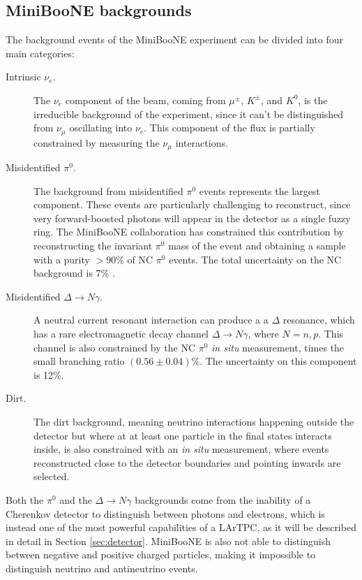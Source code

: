 \subsection*{MiniBooNE backgrounds}
The background events of the MiniBooNE experiment can be divided into four main categories:
\begin{description}
    \item[Intrinsic $\nu_e$.] The $\nu_e$ component of the beam, coming from $\mu^{\pm}$, $K^{\pm}$, and $K^0$, is the irreducible background of the experiment, since it can't be distinguished from $\nu_{\mu}$ oscillating into $\nu_{e}$. This component of the flux is partially constrained by measuring the $\nu_{\mu}$ interactions.
    \item[Misidentified $\pi^0$.] The background from misidentified $\pi^0$ events represents the largest component. These events are particularly challenging to reconstruct, since very forward-boosted photons will appear in the detector as a single fuzzy ring. The MiniBooNE collaboration has constrained this contribution by reconstructing the invariant $\pi^0$ mass of the event and obtaining a sample with a purity $>90\%$ of NC $\pi^0$ events. The total uncertainty on the NC background is 7\% \cite{Karagiorgi:2010zz}.
    \item[Misidentified $\Delta\rightarrow N\gamma$.] A neutral current resonant interaction can produce a a $\Delta$ resonance, which has a rare electromagnetic decay channel $\Delta\rightarrow N\gamma$, where $N=n,p$. This channel is also constrained by the NC $\pi^0$ \emph{in situ} measurement, times the small branching ratio  $(0.56\pm0.04)\%$. The uncertainty on this component is 12\%.
    \item[Dirt.] The dirt background, meaning neutrino interactions happening outside the detector but where at at least one particle in the final states interacts inside, is also constrained with an \emph{in situ} measurement, where events reconstructed close to the detector boundaries and pointing inwards are selected. 
\end{description}

Both the $\pi^0$ and the $\Delta\to N\gamma$ backgrounds come from the inability of a Cherenkov detector to distinguish between photons and electrons, which is instead one of the most powerful capabilities of a LArTPC, as it will be described in detail in Section \ref{sec:detector}. MiniBooNE is also not able to distinguish between negative and positive charged particles, making it impossible to distinguish neutrino and antineutrino events.

